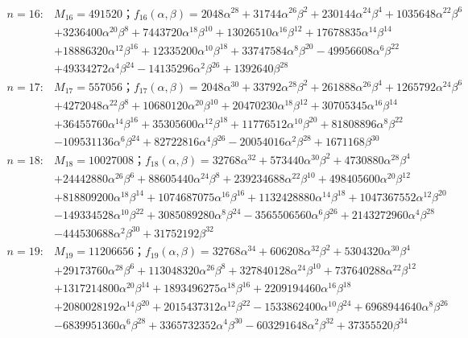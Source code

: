 \begin{flushleft}
\begin{align*}
n=16:&M_{16}=491520；f_{16}(\alpha,\beta)=2048\alpha^{28}+31744\alpha^{26}\beta^2+230144\alpha^{24}\beta^4+1035648\alpha^{22}\beta^6\\ 
&+3236400\alpha^{20}\beta^{8}+7443720\alpha^{18}\beta^{10}+13026510\alpha^{16}\beta^{12}+17678835\alpha^{14}\beta^{14}\\ 
&+18886320\alpha^{12}\beta^{16}+12335200\alpha^{10}\beta^{18}+33747584\alpha^8\beta^{20}-49956608\alpha^6\beta^{22}\\ &+49334272\alpha^4\beta^{24}-14135296\alpha^2\beta^{26}+1392640\beta^{28}\\
n=17:&M_{17}=557056；f_{17}(\alpha,\beta)=2048\alpha^{30}+33792\alpha^{28}\beta^2+261888\alpha^{26}\beta^4+1265792\alpha^{24}\beta^6\\ 
&+4272048\alpha^{22}\beta^{8}+10680120\alpha^{20}\beta^{10}+20470230\alpha^{18}\beta^{12}+30705345\alpha^{16}\beta^{14}\\ 
&+36455760\alpha^{14}\beta^{16}+35305600\alpha^{12}\beta^{18}+11776512\alpha^{10}\beta^{20}+81808896\alpha^8\beta^{22}\\ &-109531136\alpha^6\beta^{24}+82722816\alpha^4\beta^{26}-20054016\alpha^2\beta^{28}+1671168\beta^{30}\\
n=18:&M_{18}=10027008；f_{18}(\alpha,\beta)=32768\alpha^{32}+573440\alpha^{30}\beta^2+4730880\alpha^{28}\beta^4\\ 
&+24442880\alpha^{26}\beta^6+88605440\alpha^{24}\beta^{8}+239234688\alpha^{22}\beta^{10}+498405600\alpha^{20}\beta^{12}\\ 
&+818809200\alpha^{18}\beta^{14}+1074687075\alpha^{16}\beta^{16}+1132428880\alpha^{14}\beta^{18}+1047367552\alpha^{12}\beta^{20}\\ 
&-149334528\alpha^{10}\beta^{22}+3085089280\alpha^8\beta^{24}-3565506560\alpha^6\beta^{26}+2143272960\alpha^4\beta^{28}\\ 
&-444530688\alpha^2\beta^{30}+31752192\beta^{32}\\ 
n=19:&M_{19}=11206656；f_{19}(\alpha,\beta)=32768\alpha^{34}+606208\alpha^{32}\beta^2+5304320\alpha^{30}\beta^4\\ 
&+29173760\alpha^{28}\beta^6+113048320\alpha^{26}\beta^{8}+327840128\alpha^{24}\beta^{10}+737640288\alpha^{22}\beta^{12}\\ 
&+1317214800\alpha^{20}\beta^{14}+1893496275\alpha^{18}\beta^{16}+2209194460\alpha^{16}\beta^{18}\\ 
&+2080028192\alpha^{14}\beta^{20}+2015437312\alpha^{12}\beta^{22}-1533862400\alpha^{10}\beta^{24}+6968944640\alpha^8\beta^{26}\\ &-6839951360\alpha^6\beta^{28}+3365732352\alpha^4\beta^{30}-603291648\alpha^2\beta^{32}+37355520\beta^{34}\\

\end{align*}
\end{flushleft}

